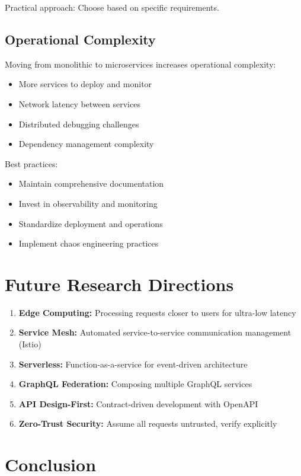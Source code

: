 \documentclass[conference]{IEEEtran}
\begin{document}
\begin{enumerate}
Practical approach: Choose based on specific requirements.

\subsection{Operational Complexity}

Moving from monolithic to microservices increases operational complexity:
\begin{itemize}
    \item More services to deploy and monitor
    \item Network latency between services
    \item Distributed debugging challenges
    \item Dependency management complexity
\end{itemize}

Best practices:
\begin{itemize}
    \item Maintain comprehensive documentation
    \item Invest in observability and monitoring
    \item Standardize deployment and operations
    \item Implement chaos engineering practices
\end{itemize}

\section{Future Research Directions}

\begin{enumerate}
    \item \textbf{Edge Computing:} Processing requests closer to users for ultra-low latency
    \item \textbf{Service Mesh:} Automated service-to-service communication management (Istio)
    \item \textbf{Serverless:} Function-as-a-service for event-driven architecture
    \item \textbf{GraphQL Federation:} Composing multiple GraphQL services
    \item \textbf{API Design-First:} Contract-driven development with OpenAPI
    \item \textbf{Zero-Trust Security:} Assume all requests untrusted, verify explicitly
\end{enumerate}

\section{Conclusion}


\end{enumerate}
\end{document}
